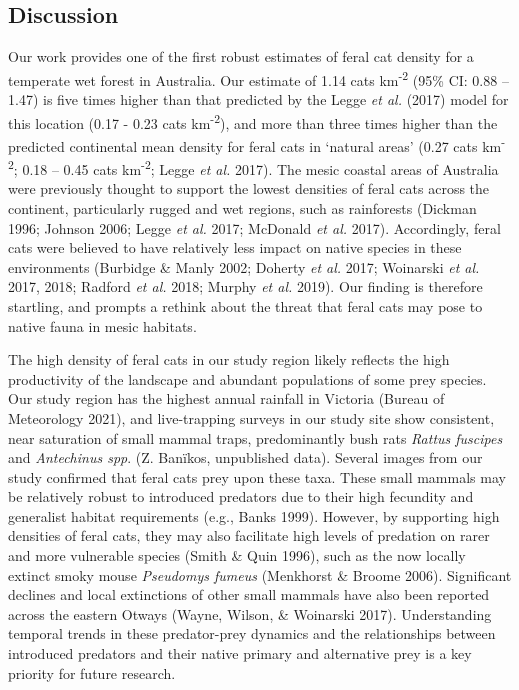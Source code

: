 \documentclass[11pt,a4paper,titlepage,twoside,openright]{style/unimelbthesis}
\begin{document}
\begin{mainmatter}
{\section{Discussion}\label{discussion}}

Our work provides one of the first robust estimates of feral cat density for a temperate wet forest in Australia. Our estimate of 1.14 cats km\textsuperscript{-2} (95\% CI: 0.88 -- 1.47) is five times higher than that predicted by the Legge \emph{et al.} (2017) model for this location (0.17 - 0.23 cats km\textsuperscript{-2}), and more than three times higher than the predicted continental mean density for feral cats in `natural areas' (0.27 cats km\textsuperscript{-2}; 0.18 -- 0.45 cats km\textsuperscript{-2}; Legge \emph{et al.} 2017). The mesic coastal areas of Australia were previously thought to support the lowest densities of feral cats across the continent, particularly rugged and wet regions, such as rainforests (Dickman 1996; Johnson 2006; Legge \emph{et al.} 2017; McDonald \emph{et al.} 2017). Accordingly, feral cats were believed to have relatively less impact on native species in these environments (Burbidge \& Manly 2002; Doherty \emph{et al.} 2017; Woinarski \emph{et al.} 2017, 2018; Radford \emph{et al.} 2018; Murphy \emph{et al.} 2019). Our finding is therefore startling, and prompts a rethink about the threat that feral cats may pose to native fauna in mesic habitats.

The high density of feral cats in our study region likely reflects the high productivity of the landscape and abundant populations of some prey species. Our study region has the highest annual rainfall in Victoria (Bureau of Meteorology 2021), and live-trapping surveys in our study site show consistent, near saturation of small mammal traps, predominantly bush rats \emph{Rattus fuscipes} and \emph{Antechinus spp}. (Z. Banïkos, unpublished data). Several images from our study confirmed that feral cats prey upon these taxa. These small mammals may be relatively robust to introduced predators due to their high fecundity and generalist habitat requirements (e.g., Banks 1999). However, by supporting high densities of feral cats, they may also facilitate high levels of predation on rarer and more vulnerable species (Smith \& Quin 1996), such as the now locally extinct smoky mouse \emph{Pseudomys fumeus} (Menkhorst \& Broome 2006). Significant declines and local extinctions of other small mammals have also been reported across the eastern Otways (Wayne, Wilson, \& Woinarski 2017). Understanding temporal trends in these predator-prey dynamics and the relationships between introduced predators and their native primary and alternative prey is a key priority for future research.


\end{mainmatter}
\end{document}
